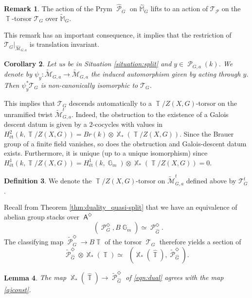 \documentclass{article}
\DeclareMathOperator{\Hom}{\mathsf{Hom}}
\DeclareMathOperator{\A}{\mathsf{A}}
\DeclareMathOperator{\Tt}{\mathcal{T}}
\DeclareMathOperator{\Xb}{\mathbb{X}}
\DeclareMathOperator{\G}{\mathbb{G}}
\DeclareMathOperator{\Tb}{\mathbb{T}}
\newcommand{\Mc}{\mathcal{M}}
\DeclareMathOperator{\Pc}{\mathcal{P}}
\DeclareMathOperator{\Hhom}{\underline{\Hom}}
\theoremstyle{definition}
\newtheorem{definition}{Definition}[section]
\newtheorem{rmk}[definition]{Remark}
\theoremstyle{plain}
\newtheorem{corollary}[definition]{Corollary}
\newtheorem{lemma}[definition]{Lemma}
\begin{document}
\begin{rmk}
The action of the Prym $\widehat{\Pc}_G$ on $\widehat{\mathbb{M}}_G$ lifts to an action of $\mathcal{T}_{\Pc}$ on the $\Tb$-torsor $\mathcal{T}_G$ over $\widetilde{\mathbb{M}}_G$. 
\end{rmk}

This remark has an important consequence, it implies that the restriction of $\mathcal{T}_G|_{\widehat{\Mc}_{G,a}}$ is translation invariant.

\begin{corollary}
Let us be in Situation \ref{situation:split} and $y \in \Pc_{G,a}(k)$. We denote by $\psi_y\colon \widetilde{\Mc}_{G,a} \to \widetilde{\Mc}_{G,a}$ the induced automorphism given by acting through $y$. Then $\psi_y^*\mathcal{T}_G$ is non-canonically isomorphic to $\mathcal{T}_G$.
\end{corollary}

This implies that $\mathcal{T}_G$ descends automatically to a $\Tb/Z(X,G)$-torsor on the unramified twist $\widetilde{\Mc}_{G,a}^{t}$. Indeed, the obstruction to the existence of a Galois descent datum is given by a $2$-cocycles with values in $H^2_{\text{\'et}}(k,\Tb/Z(X,G)) = Br(k) \otimes \Xb_*(\Tb/Z(X,G))$. Since the Brauer group of a finite field vanishes, so does the obstruction and Galois-descent datum exists. Furthermore, it is unique (up to a unique isomorphism) since $H^1_{\text{\'et}}(k,\Tb/Z(X,G)) = H^1_{\text{\'et}}(k,\G_m) \otimes \Xb_*(\Tb/Z(X,G)) = 0$.

\begin{definition}
We denote the $\Tb/Z(X,G)$-torsor on $\widetilde{\Mc}_{G,a}^t$ defined above by $\mathcal{T}_G^t$.
\end{definition}



Recall from Theorem \ref{thm:duality_quasi-split} that we have an equivalence of abelian group stacks over $\A^{\Diamond}$ 
$$\Hhom(\Pc_G^{\Diamond},B\G_m) \simeq \Pc_{\widehat{G}}^{\Diamond}.$$
The classifying map $\widetilde{\Pc}_G^{\Diamond}\to B\Tb$ of the torsor $\Tt_G$ therefore yields a section of 
\begin{equation}\label{eqn:dual}
  \widetilde{\Pc}_{\widehat{G}}^{\Diamond} \otimes \Xb_*(\Tb) \simeq \Hhom(\Xb_*(\widehat{\Tb}),\widetilde{\Pc}_{\widehat{G}}^{\Diamond}).
\end{equation}

\begin{lemma}\label{lemma:dual_torsor}
The map $\Xb_*(\widehat{\Tb}) \to \widetilde{\Pc}^{\Diamond}_{\widehat{G}}$ of \eqref{eqn:dual} agrees with the map \eqref{ajconst}.
\end{lemma}
\end{document}
